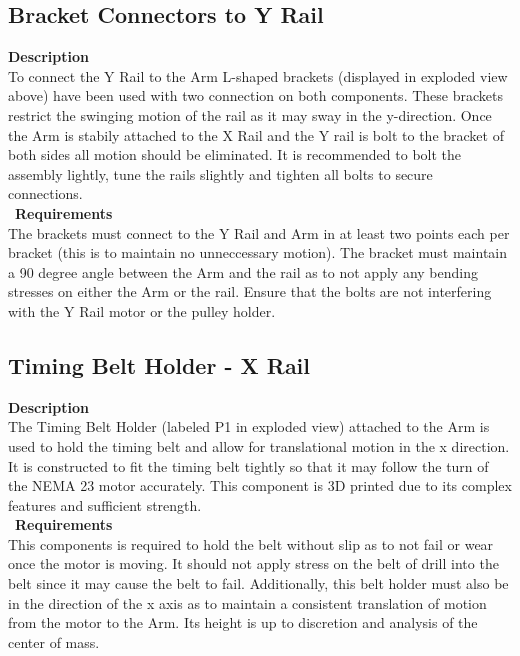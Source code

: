 \documentclass[titlepage]{article}
\begin{document}
\begin{center}
\begin{center}
\begin{center}
\begin{center}
\begin{center}
\begin{center}
\begin{center}
\begin{center}
\subsection{Bracket Connectors to Y Rail}
\textbf{Description}\\
To connect the Y Rail to the Arm L-shaped brackets (displayed in exploded view above) have been used with two connection on both components. These brackets restrict the swinging motion of the rail as it may sway in the y-direction. Once the Arm is stabily attached to the X Rail and the Y rail is bolt to the bracket of both sides all motion should be eliminated. It is recommended to bolt the assembly lightly, tune the rails slightly and tighten all bolts to secure connections.\\\
\textbf{Requirements}\\
The brackets must connect to the Y Rail and Arm in at least two points each per bracket (this is to maintain no unneccessary motion). The bracket must maintain a 90 degree angle between the Arm and the rail as to not apply any bending stresses on either the Arm or the rail. Ensure that the bolts are not interfering with the Y Rail motor or the pulley holder.
\begin{center}



\subsection{Timing Belt Holder - X Rail}
\textbf{Description}\\
The Timing Belt Holder (labeled P1 in exploded view) attached to the Arm is used to hold the timing belt and allow for translational motion in the x direction. It is constructed to fit the timing belt tightly so that it may follow the turn of the NEMA 23 motor accurately. This component is 3D printed due to its complex features and sufficient strength.\\\
\textbf{Requirements}\\
This components is required to hold the belt without slip as to not fail or wear once the motor is moving. It should not apply stress on the belt of drill into the belt since it may cause the belt to fail. Additionally, this belt holder must also be in the direction of the x axis as to maintain a consistent translation of motion from the motor to the Arm. Its height is up to discretion and analysis of the center of mass.
\begin{center}


\end{center}
\end{center}
\end{center}
\end{center}
\end{center}
\end{center}
\end{center}
\end{center}
\end{center}
\end{center}
\end{document}
